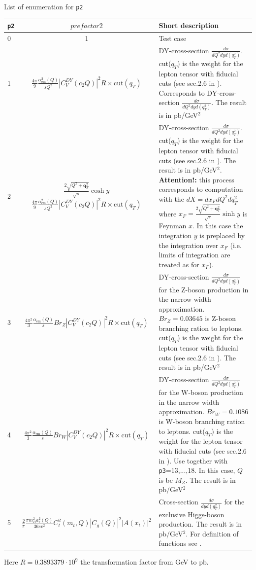 \documentclass[prd,nofootinbib,eqsecnum,final]{revtex4}
\renewcommand{\(}{\left(}
\renewcommand{\)}{\right)}
\renewcommand{\[}{\left[}
\renewcommand{\]}{\right]}
\renewcommand{\vec}[1]{\bm{#1}}
\begin{document}
\begin{center}
List of enumeration for \texttt{p2}
\\
\begin{tabular}{||l|c||p{10cm}||}
\hline\hline
\texttt{p2} & ~~$prefactor2$~~&  Short description 
\\\hline
0 & 1 & Test case
\\\hline
1 & $\frac{4\pi}{9}\frac{\alpha_{\text{em}}^2(Q)}{sQ^2}|C_V^{DY}(c_2Q)|^2 R \times \text{cut}(q_T)$ & DY-cross-section $\frac{d\sigma}{dQ^2 dy d(q_T^2)}$. cut($q_T$) is the weight for the lepton tensor with fiducial cuts (see sec.2.6 in \cite{Scimemi:2017etj}). Corresponds to DY-cross-section $\frac{d\sigma}{dQ^2 dy d(q_T^2)}$.  The result is in pb/GeV$^2$
\\\hline
2 & $\frac{2\sqrt{Q^2+\vec q_T^2}}{\sqrt{s}}\cosh y$ $\frac{4\pi}{9}\frac{\alpha_{\text{em}}^2(Q)}{sQ^2}|C_V^{DY}(c_2Q)|^2 R \times \text{cut}(q_T)$ & DY-cross-section $\frac{d\sigma}{dQ^2 dy d(q_T^2)}$. cut($q_T$) is the weight for the lepton tensor with fiducial cuts (see sec.2.6 in \cite{Scimemi:2017etj}).  The result is in pb/GeV$^2$. \textbf{Attention!:} this process corresponds to computation with the $dX=dx_F dQ^2 dq_T^2$ where $x_F=\frac{2\sqrt{Q^2+\vec q_T^2}}{\sqrt{s}}\sinh y$ is Feynman $x$. In this case the integration $y$ is preplaced by the integration over $x_F$ (i.e. limits of integration are treated as for $x_F$).
\\\hline
3 & $\frac{4\pi^2}{3}\frac{\alpha_{\text{em}}(Q)}{s}Br_Z|C_V^{DY}(c_2Q)|^2 R \times \text{cut}(q_T)$ & DY-cross-section $\frac{d\sigma}{dQ^2 dy d(q_T^2)}$ for the Z-boson production in the narrow width approximation. $Br_Z=0.03645$ is Z-boson branching ration to leptons. cut($q_T$) is the weight for the lepton tensor with fiducial cuts (see sec.2.6 in \cite{Scimemi:2017etj}). The result is in pb/GeV$^2$
\\\hline
4 & $\frac{4\pi^2}{3}\frac{\alpha_{\text{em}}(Q)}{s}Br_W|C_V^{DY}(c_2Q)|^2 R \times \text{cut}(q_T)$ & DY-cross-section $\frac{d\sigma}{dQ^2 dy d(q_T^2)}$ for the W-boson production in the narrow width approximation. $Br_W=0.1086$ is W-boson branching ration to leptons. cut($q_T$) is the weight for the lepton tensor with fiducial cuts (see sec.2.6 in \cite{Scimemi:2017etj}). Use together with \texttt{p3}=13,...,18. In this case, $Q$ is be $M_Z$. The result is in pb/GeV$^2$
\\\hline
5 & $\frac{2}{\pi}\frac{\pi m_H^2 a_s^2(Q)}{36 s v^2}C_t^2(m_t,Q)|C_g(Q)|^2|A(x_t)|^2$ & Cross-section $\frac{d\sigma}{dy d(q_T^2)}$ for the exclusive Higgs-boson production. The result is in pb/GeV$^2$. For definition of functions see \cite{Ahrens:2009cxz}.
\\\hline\hline
\end{tabular}
Here $R=0.3893379\cdot 10^9$ the transformation factor from GeV to pb.
\end{center}
\end{document}

